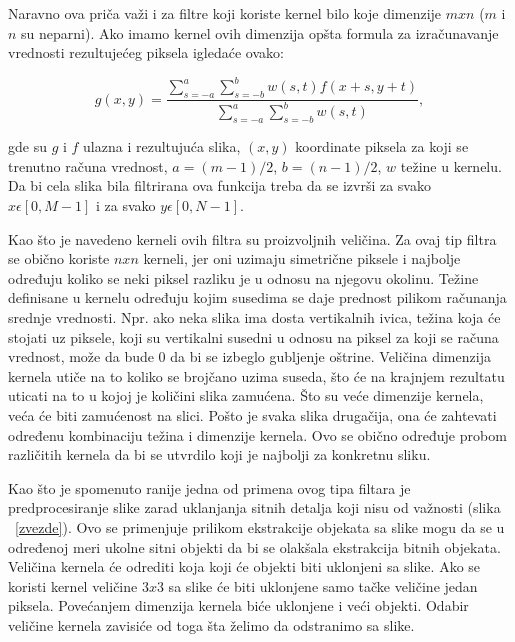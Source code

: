 \documentclass[a4paper,12pt,titlepage]{article}
\begin{document}
Naravno ova priča važi i za filtre koji koriste kernel bilo koje dimenzije $m x n$ ($m$ i $n$ su neparni). Ako imamo kernel ovih dimenzija opšta formula za izračunavanje vrednosti rezultujećeg piksela igledaće ovako: 

\begin{equation}\label{eq:smoot1}
g(x, y) = \dfrac{\sum_{s = -a}^{a} \sum_{s = -b}^{b} w(s, t)f(x + s, y + t)}{\sum_{s = -a}^{a} \sum_{s = -b}^{b} w(s, t)},  
\end{equation}

gde su $g$ i $f$ ulazna i rezultujuća slika, $(x, y)$ koordinate piksela za koji se trenutno računa vrednost, $a = (m - 1) / 2$, $b = (n - 1) / 2$, $w$ težine u kernelu. Da bi cela slika bila filtrirana ova funkcija treba da se izvrši za svako $x \epsilon [0, M - 1]$ i za svako $y \epsilon [0, N - 1]$. 

Kao što je navedeno kerneli ovih filtra su proizvoljnih veličina. Za ovaj tip filtra se obično koriste $n x n$ kerneli, jer oni uzimaju simetrične piksele i najbolje određuju koliko se neki piksel razliku je u odnosu na njegovu okolinu. Težine definisane u kernelu određuju kojim susedima se daje prednost pilikom računanja srednje vrednosti. Npr. ako neka slika ima dosta vertikalnih ivica, težina koja će stojati uz piksele, koji su vertikalni susedni u odnosu na piksel za koji se računa vrednost, može da bude 0 da bi se izbeglo gubljenje oštrine. Veličina dimenzija kernela utiče na to koliko se brojčano uzima suseda, što će na krajnjem rezultatu uticati na to u kojoj je količini slika zamućena. Što su veće dimenzije kernela, veća će biti zamućenost na slici. Pošto je svaka slika drugačija, ona će zahtevati određenu kombinaciju težina i dimenzije kernela. Ovo se obično određuje probom različitih kernela da bi se utvrdilo koji je najbolji za konkretnu sliku. 

Kao što je spomenuto ranije jedna od primena ovog tipa filtara je predprocesiranje slike zarad uklanjanja sitnih detalja koji nisu od važnosti (slika ~\ref{zvezde}). Ovo se primenjuje prilikom ekstrakcije objekata sa slike mogu da se u određenoj meri ukolne sitni objekti da bi se olakšala ekstrakcija bitnih objekata. Veličina kernela će odrediti koja koji će objekti biti uklonjeni sa slike. Ako se koristi kernel veličine $3 x 3$ sa slike će biti uklonjene samo tačke veličine jedan piksela. Povećanjem dimenzija kernela biće uklonjene i veći objekti. Odabir veličine kernela zavisiće od toga šta želimo da odstranimo sa slike.
\end{document}
